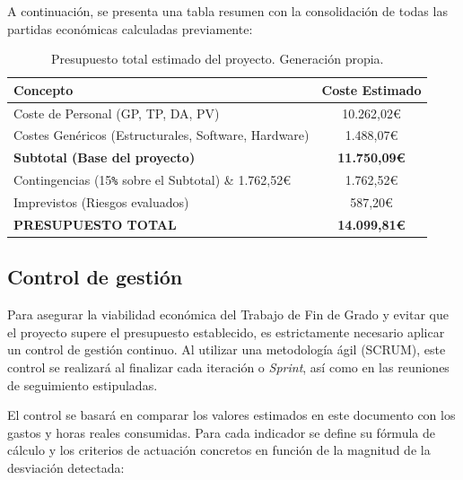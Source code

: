 \documentclass[11pt, letterpaper]{article}
\begin{document}
A continuación, se presenta una tabla resumen con la consolidación de todas las partidas económicas calculadas previamente:

\begin{table}[H]
    \centering
    \begin{tabular}{|l|c|}
         \hline
         \textbf{Concepto} & \textbf{Coste Estimado} \\ 
         \hline
         \hline
         Coste de Personal (GP, TP, DA, PV) & 10.262,02€ \\
         Costes Genéricos (Estructurales, Software, Hardware) & 1.488,07€ \\
         \hline
         \textbf{Subtotal (Base del proyecto)} & \textbf{11.750,09€} \\
         \hline
         Contingencias (15\verb|%| sobre el Subtotal) & 1.762,52€ \\
         Imprevistos (Riesgos evaluados) & 587,20€ \\
         \hline
         \hline
         \textbf{PRESUPUESTO TOTAL} & \textbf{14.099,81€} \\
         \hline
    \end{tabular}
    \caption{Presupuesto total estimado del proyecto. Generación propia.}
    \label{tab:coste_total}
\end{table}

\subsection{Control de gestión}
Para asegurar la viabilidad económica del Trabajo de Fin de Grado y evitar que el proyecto supere el presupuesto establecido, es estrictamente necesario aplicar un control de gestión continuo. Al utilizar una metodología ágil (SCRUM), este control se realizará al finalizar cada iteración o \textit{Sprint}, así como en las reuniones de seguimiento estipuladas.

El control se basará en comparar los valores estimados en este documento con los gastos y horas reales consumidas. Para cada indicador se define su fórmula de cálculo y los criterios de actuación concretos en función de la magnitud de la desviación detectada:
\end{document}
